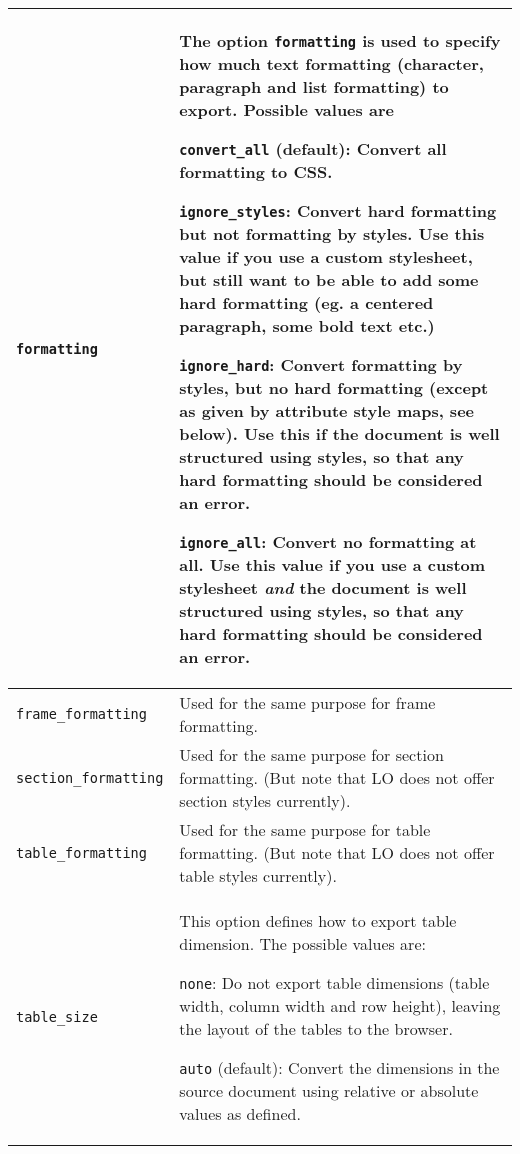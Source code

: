 \documentclass{article}
\newcommand\textstyleSourceText[1]{\texttt{\textmd{#1}}}
\begin{document}
\begin{center}
\begin{tabular}{|m{5.78cm}|m{10.833cm}|}

\hline
{\mdseries \textstyleSourceText{formatting}} &
{\mdseries The option \textstyleSourceText{formatting} is used to specify how much text formatting (character, paragraph and list formatting) to export\footnotemark{}. Possible values are}

{\mdseries \textstyleSourceText{convert\_all} (default): Convert all formatting to CSS.}

{\mdseries \textstyleSourceText{ignore\_styles}: Convert hard formatting but not formatting by styles. Use this value if you use a custom stylesheet, but still want to be able to add some hard formatting (eg. a centered paragraph, some bold text etc.)}

{\mdseries \textstyleSourceText{ignore\_hard}: Convert formatting by styles, but no hard formatting (except as given by attribute style maps, see below). Use this if the document is well structured using styles, so that any hard formatting should be considered an error.}

{\mdseries \textstyleSourceText{ignore\_all}: Convert no formatting at all. Use this value if you use a custom stylesheet \emph{and} the document is well structured using styles, so that any hard formatting should be considered an error.}\\\hline
{\mdseries \textstyleSourceText{frame\_formatting}} &
{\mdseries Used for the same purpose for frame formatting.}\\\hline
{\mdseries \textstyleSourceText{section\_formatting}} &
{\mdseries Used for the same purpose for section formatting. (But note that LO does not offer section styles currently).}\\\hline
{\mdseries \textstyleSourceText{table\_formatting}} &
{\mdseries Used for the same purpose for table formatting. (But note that LO does not offer table styles currently).}\\\hline
{\mdseries \textstyleSourceText{table\_size\footnotemark{}}} &
{\mdseries This option defines how to export table dimension. The possible values are:}

{\mdseries \textstyleSourceText{none}: Do not export table dimensions (table width, column width and row height), leaving the layout of the tables to the browser.}

{\mdseries \textstyleSourceText{auto} (default): Convert the dimensions in the source document using relative or absolute values as defined.}


\end{tabular}
\end{center}
\end{document}

